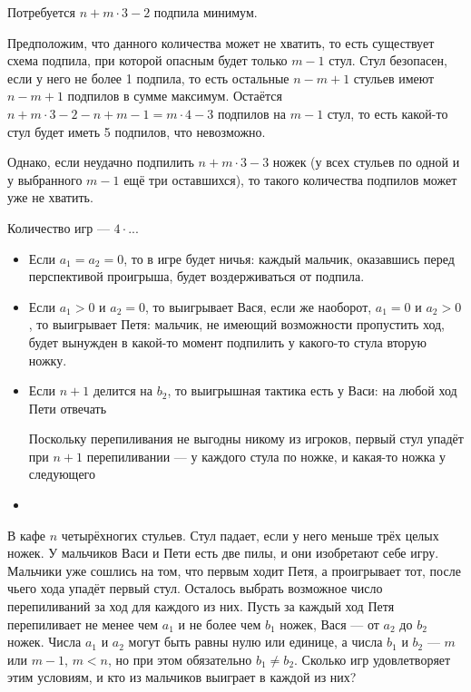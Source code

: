 \begin{itemize}
\itA {}

\itB 


Потребуется $n + m \cdot 3 - 2$ подпила минимум.

Предположим, что данного количества может не хватить, то есть существует
схема подпила, при которой опасным будет только $m-1$ стул. 
Стул безопасен, если у него не более 1 подпила, 
то есть остальные $n-m+1$ стульев имеют $n-m+1$ подпилов в сумме максимум.
Остаётся $n + m \cdot 3 - 2 - n + m -1 = m \cdot 4 - 3$ подпилов на $m-1$ стул,
то есть какой-то стул будет иметь 5 подпилов, что невозможно.

Однако, если неудачно подпилить $n + m \cdot 3 - 3$ ножек (у всех стульев по
одной и у выбранного $m-1$ ещё три оставшихся), то такого количества
подпилов может уже не хватить.

\itC Количество игр --- $4 \cdot ...$

\begin{itemize}
\item Если $a_1 = a_2 = 0$, то в игре будет ничья:
каждый мальчик, оказавшись перед перспективой проигрыша, будет воздерживаться от подпила.

\item Если $a_1 > 0$ и $a_2 = 0$, то выигрывает Вася, если же наоборот, $a_1 = 0$ и $a_2 > 0$,
то выигрывает Петя: мальчик, не имеющий возможности пропустить ход, будет вынужден в какой-то
момент подпилить у какого-то стула вторую ножку.

\item Если $n+1$ делится на $b_2$, то выигрышная тактика есть у Васи:
на любой ход Пети отвечать 


Поскольку перепиливания не выгодны никому из игроков, первый стул упадёт при
$n+1$ перепиливании --- у каждого стула по ножке, и какая-то ножка у следующего

\item 
\end{itemize}

В кафе $n$ четырёхногих стульев. Стул падает, если у него меньше 
трёх целых ножек. У мальчиков Васи и Пети есть две пилы, и они изобретают 
себе игру. Мальчики уже сошлись на том, что первым ходит Петя, а проигрывает 
тот, после чьего хода упадёт первый стул. Осталось выбрать возможное число 
перепиливаний за ход для каждого из них. Пусть за каждый ход Петя 
перепиливает не менее чем $a_1$ и не более чем $b_1$ ножек, Вася — от $a_2$ до 
$b_2$ ножек. Числа $a_1$ и $a_2$ могут быть равны нулю или единице, а 
числа $b_1$ и $b_2$ — $m$ или $m-1$, $m<n$, но при этом обязательно $b_1 \ne b_2$. 
Сколько игр удовлетворяет этим условиям, и кто из мальчиков выиграет в каждой из них?
\end{itemize}
